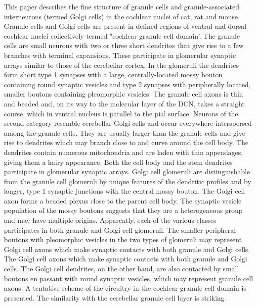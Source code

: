 

\citep{Ryugo:2008}
    



This paper describes the fine structure of granule cells and granule-associated interneurons (termed Golgi cells) in the cochlear nuclei of cat, rat and mouse. 
Granule cells and Golgi cells are present in defined regions of ventral and dorsal cochlear nuclei collectively termed "cochlear granule cell domain'. The granule cells are small neurons with two or three short dendrites that give rise to a few branches with terminal expansions. These participate in glomerular synaptic arrays similar to those of the cerebellar cortex. In the glomeruli the dendrites form short type 1 synapses with a large, centrally-located mossy bouton containing round synaptic vesicles and type 2 synapses with peripherally located, smaller boutons containing pleomorphic vesicles. The granule cell axons is thin and beaded and, on its way to the molecular layer of the DCN, takes a straight course, which in ventral nucleus is parallel to the pial surface. Neurons of the second category resemble cerebellar Golgi cells and occur everywhere interspersed among the granule cells. They are usually larger than the granule cells and give rise to dendrites which may branch close to and curve around the cell body. The dendrites contain numerous mitochondria and are laden with thin appendages, giving them a hairy appearance. 
Both the cell body and the stem dendrites participate in glomerular synaptic arrays. 
Golgi cell glomeruli are distinguishable from the granule cell glomeruli by unique features of the dendritic profiles and by longer, type 1 synaptic junctions with the central mossy bouton. 
The Golgi cell axon forms a beaded plexus close to the parent cell body. The synaptic vesicle population of the mossy boutons suggests that they are a heterogeneous group and may have multiple origins. 
Apparently, each of the various classes participates in both granule and Golgi cell glomeruli. 
The smaller peripheral boutons with pleomorphic vesicles in the two types of glomeruli may represent Golgi cell axons which make synaptic contacts with both granule and Golgi cells. The Golgi cell axons which make synaptic contacts with both granule and Golgi cells. The Golgi cell dendrites, on the other hand, are also contacted by small boutons en passant with round synaptic vesicles, which may represent granule cell axons. A tentative scheme of the circuitry in the cochlear granule cell domain is presented. The similarity with the cerebellar granule cell layer is striking.


